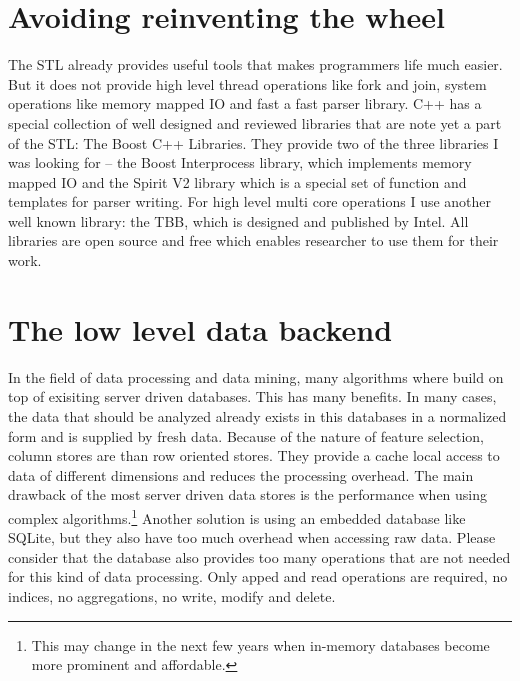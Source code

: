 \section{Avoiding reinventing the wheel}
The STL already provides useful tools that makes programmers life much easier. But it does not provide high level thread operations like fork and join, system operations like memory mapped IO and fast a fast parser library. C++ has a special collection of well designed and reviewed libraries that are note yet a part of the STL: The Boost C++ Libraries. They provide two of the three libraries I was looking for -- the Boost Interprocess library, which implements memory mapped IO and the Spirit V2 library which is a special set of function and templates for parser writing. For high level multi core operations I use another well known library: the TBB, which is designed and published by Intel. All libraries are open source and free which enables researcher to use them for their work.

\section{The low level data backend}
In the field of data processing and data mining, many algorithms where build on top of exisiting server driven databases. This has many benefits. In many cases, the data that should be analyzed already exists in this databases in a normalized form and is supplied by fresh data. Because of the nature of feature selection, column stores are than row oriented stores. They provide a cache local access to data of different dimensions and reduces the processing overhead. The main drawback of the most server driven data stores is the performance when using complex algorithms.\footnote{This may change in the next few years when in-memory databases become more prominent and affordable.} Another solution is using an embedded database like SQLite, but they also have too much overhead when accessing raw data. Please consider that the database also provides too many operations that are not needed for this kind of data processing. Only apped and read operations are required, no indices, no aggregations, no write, modify and delete.

